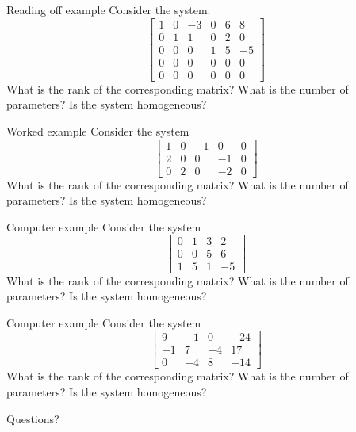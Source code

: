 \documentclass{beamer}
\begin{document}
\begin{frame}{Reading off example}
  Consider the system:
  \begin{equation*}
    \left[
      \begin{array}{rrrrr|r}
        1 & 0 & -3 & 0 & 6 & 8  \\
        0 & 1 & 1 & 0 & 2 & 0  \\
        0 & 0 & 0 & 1 & 5 & -5 \\
        0 & 0 & 0 & 0 & 0 & 0\\
        0 & 0 & 0 & 0 & 0 &0
      \end{array}\right] 
  \end{equation*}
  What is the rank of the corresponding matrix?
  What is the number of parameters?
  Is the system homogeneous?
\end{frame}

\begin{frame}{Worked example}
  Consider the system
  \begin{equation*}
    \left[
      \begin{array}{rrrr|r}
        1 & 0 & -1 & 0 & 0 \\
        2 & 0 & 0 & -1 & 0  \\
        0 & 2 & 0 & -2 & 0
      \end{array}\right] 
  \end{equation*}
  What is the rank of the corresponding matrix?
  What is the number of parameters?
  Is the system homogeneous?
\end{frame}

\begin{frame}{Computer example}
  Consider the system
  \begin{equation*}
    \left[
      \begin{array}{rrr|r}
        0 & 1 & 3 & 2  \\
        0 & 0 & 5 & 6   \\
        1 & 5 & 1 & -5 
      \end{array}\right] 
  \end{equation*}
  What is the rank of the corresponding matrix?
  What is the number of parameters?
  Is the system homogeneous?
\end{frame}

\begin{frame}{Computer example}
  Consider the system
  \begin{equation*}
    \left[
      \begin{array}{rrr|r}
        9 & -1 & 0 & -24  \\
        -1 & 7 & -4 & 17   \\
        0 & -4 & 8 & -14 
      \end{array}\right] 
  \end{equation*}
  What is the rank of the corresponding matrix?
  What is the number of parameters?
  Is the system homogeneous?
\end{frame}

\begin{frame}
  Questions?
\end{frame}
\end{document}
